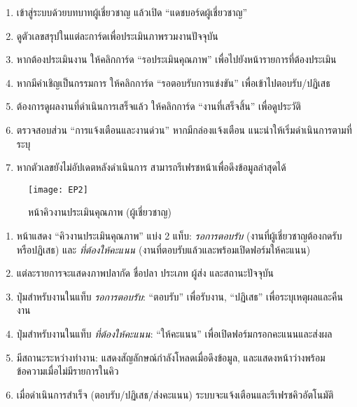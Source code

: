 \begin{sloppypar}
	\begin{enumerate}
		\item เข้าสู่ระบบด้วยบทบาทผู้เชี่ยวชาญ แล้วเปิด “แดชบอร์ดผู้เชี่ยวชาญ”
		\item ดูตัวเลขสรุปในแต่ละการ์ดเพื่อประเมินภาพรวมงานปัจจุบัน
		\item หากต้องประเมินงาน ให้คลิกการ์ด “รอประเมินคุณภาพ” เพื่อไปยังหน้ารายการที่ต้องประเมิน
		\item หากมีคำเชิญเป็นกรรมการ ให้คลิกการ์ด “รอตอบรับการแข่งขัน” เพื่อเข้าไปตอบรับ/ปฏิเสธ
		\item ต้องการดูผลงานที่ดำเนินการเสร็จแล้ว ให้คลิกการ์ด “งานที่เสร็จสิ้น” เพื่อดูประวัติ
		\item ตรวจสอบส่วน “การแจ้งเตือนและงานด่วน” หากมีกล่องแจ้งเตือน แนะนำให้เริ่มดำเนินการตามที่ระบุ
		\item หากตัวเลขยังไม่อัปเดตหลังดำเนินการ สามารถรีเฟรชหน้าเพื่อดึงข้อมูลล่าสุดได้
	\end{enumerate}
\end{sloppypar}

\begin{figure}[h]
	\centering
	\texttt{[image: EP2]}
	\caption{หน้าคิวงานประเมินคุณภาพ (ผู้เชี่ยวชาญ)}
\end{figure}

\par

\begin{sloppypar}
	\begin{enumerate}
		\item หน้าแสดง “คิวงานประเมินคุณภาพ” แบ่ง 2 แท็บ:
		\emph{รอการตอบรับ} (งานที่ผู้เชี่ยวชาญต้องกดรับหรือปฏิเสธ) และ
		\emph{ที่ต้องให้คะแนน} (งานที่ตอบรับแล้วและพร้อมเปิดฟอร์มให้คะแนน)
		\item แต่ละรายการจะแสดงภาพปลากัด ชื่อปลา ประเภท ผู้ส่ง และสถานะปัจจุบัน
		\item ปุ่มสำหรับงานในแท็บ \emph{รอการตอบรับ}:
		“ตอบรับ” เพื่อรับงาน, “ปฏิเสธ” เพื่อระบุเหตุผลและคืนงาน
		\item ปุ่มสำหรับงานในแท็บ \emph{ที่ต้องให้คะแนน}:
		“ให้คะแนน” เพื่อเปิดฟอร์มกรอกคะแนนและส่งผล
		\item มีสถานะระหว่างทำงาน: แสดงสัญลักษณ์กำลังโหลดเมื่อดึงข้อมูล,
		และแสดงหน้าว่างพร้อมข้อความเมื่อไม่มีรายการในคิว
		\item เมื่อดำเนินการสำเร็จ (ตอบรับ/ปฏิเสธ/ส่งคะแนน) ระบบจะแจ้งเตือนและรีเฟรชคิวอัตโนมัติ
	\end{enumerate}
\end{sloppypar}

